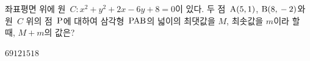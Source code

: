 좌표평면 위에 원~$C: x^2+y^2+2x-6y+8=0$이 있다. 두 점~$\mathrm{A}(5{,}\mkern3mu 1)$, $\mathrm{B}(8{,}\mkern3mu -2)$와 원~$C$ 위의 점~$\mathrm{P}$에 대하여 삼각형~$\mathrm{PAB}$의 넓이의 최댓값을 $M$, 최솟값을 $m$이라 할 때, $M+m$의 값은?
\begin{choices32}{$6$}{$9$}{$12$}{$15$}{$18$}\end{choices32}

